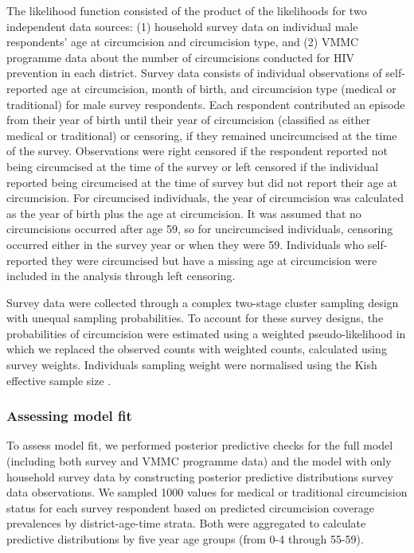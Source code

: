 \documentclass{article}
\begin{document}
The likelihood function consisted of the product of the likelihoods for two independent data sources: (1) household survey data on individual male respondents' age at circumcision and circumcision type, and (2) VMMC programme data about the number of circumcisions conducted for HIV prevention in each district. Survey data consists of individual observations of self-reported age at circumcision, month of birth, and circumcision type (medical or traditional) for male survey respondents. Each respondent contributed an episode from their year of birth until their year of circumcision (classified as either medical or traditional) or censoring, if they remained uncircumcised at the time of the survey. Observations were right censored if the respondent reported not being circumcised at the time of the survey or left censored if the individual reported being circumcised at the time of survey but did not report their age at circumcision. For circumcised individuals, the year of circumcision was calculated as the year of birth plus the age at circumcision. It was assumed that no circumcisions occurred after age 59, so for uncircumcised individuals, censoring occurred either in the survey year or when they were 59. Individuals who self-reported they were circumcised but have a missing age at circumcision were included in the analysis through left censoring.

Survey data were collected through a complex two-stage cluster sampling design with unequal sampling probabilities. To account for these survey designs, the probabilities of circumcision were estimated using a weighted pseudo-likelihood in which we replaced the observed counts with weighted counts, calculated using survey weights. Individuals sampling weight were normalised using the Kish effective sample size \cite{kish1965survey}.


\subsubsection*{Assessing model fit}


To assess model fit, we performed  posterior predictive checks for the full model (including both survey and VMMC programme data) and the model with only household survey data by constructing posterior predictive distributions survey data observations. We sampled 1000 values for medical or traditional circumcision status for each survey respondent based on predicted circumcision coverage prevalences by district-age-time strata. Both were aggregated to calculate predictive distributions by five year age groups (from 0-4 through 55-59).  
\end{document}
